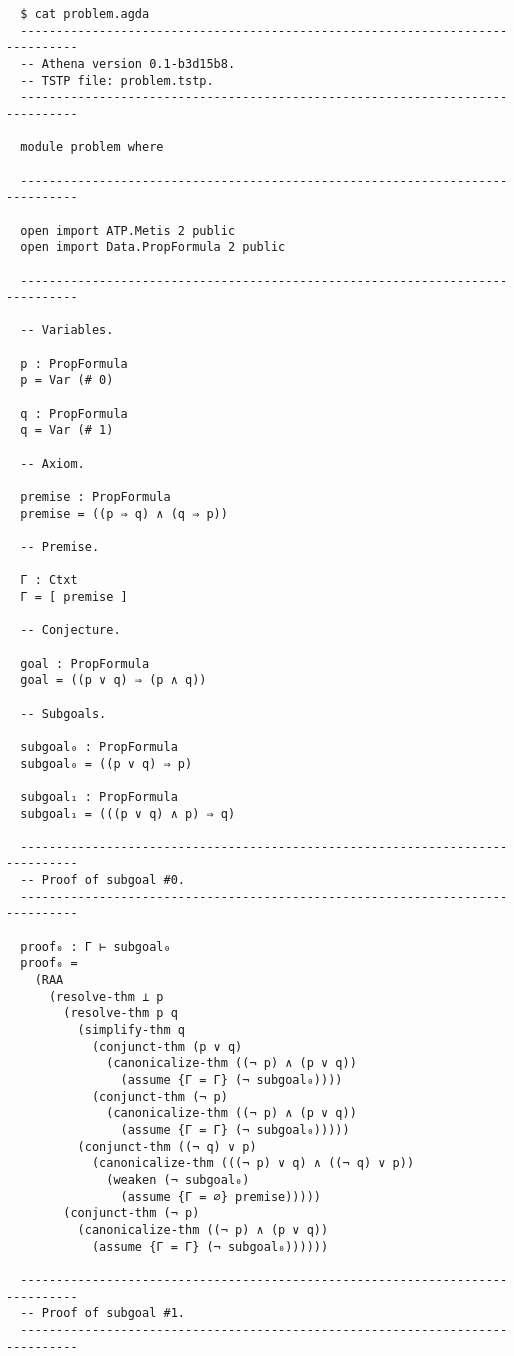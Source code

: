\documentclass[../main.tex]{subfiles}
\begin{document}
\begin{subappendices}
\begin{verbatim}
  $ cat problem.agda
  ------------------------------------------------------------------------------
  -- Athena version 0.1-b3d15b8.
  -- TSTP file: problem.tstp.
  ------------------------------------------------------------------------------

  module problem where

  ------------------------------------------------------------------------------

  open import ATP.Metis 2 public
  open import Data.PropFormula 2 public

  ------------------------------------------------------------------------------

  -- Variables.

  p : PropFormula
  p = Var (# 0)

  q : PropFormula
  q = Var (# 1)

  -- Axiom.

  premise : PropFormula
  premise = ((p ⇒ q) ∧ (q ⇒ p))

  -- Premise.

  Γ : Ctxt
  Γ = [ premise ]

  -- Conjecture.

  goal : PropFormula
  goal = ((p ∨ q) ⇒ (p ∧ q))

  -- Subgoals.

  subgoal₀ : PropFormula
  subgoal₀ = ((p ∨ q) ⇒ p)

  subgoal₁ : PropFormula
  subgoal₁ = (((p ∨ q) ∧ p) ⇒ q)

  ------------------------------------------------------------------------------
  -- Proof of subgoal #0.
  ------------------------------------------------------------------------------

  proof₀ : Γ ⊢ subgoal₀
  proof₀ =
    (RAA
      (resolve-thm ⊥ p
        (resolve-thm p q
          (simplify-thm q
            (conjunct-thm (p ∨ q)
              (canonicalize-thm ((¬ p) ∧ (p ∨ q))
                (assume {Γ = Γ} (¬ subgoal₀))))
            (conjunct-thm (¬ p)
              (canonicalize-thm ((¬ p) ∧ (p ∨ q))
                (assume {Γ = Γ} (¬ subgoal₀)))))
          (conjunct-thm ((¬ q) ∨ p)
            (canonicalize-thm (((¬ p) ∨ q) ∧ ((¬ q) ∨ p))
              (weaken (¬ subgoal₀)
                (assume {Γ = ∅} premise)))))
        (conjunct-thm (¬ p)
          (canonicalize-thm ((¬ p) ∧ (p ∨ q))
            (assume {Γ = Γ} (¬ subgoal₀))))))

  ------------------------------------------------------------------------------
  -- Proof of subgoal #1.
  ------------------------------------------------------------------------------


\end{verbatim}
\end{subappendices}
\end{document}
